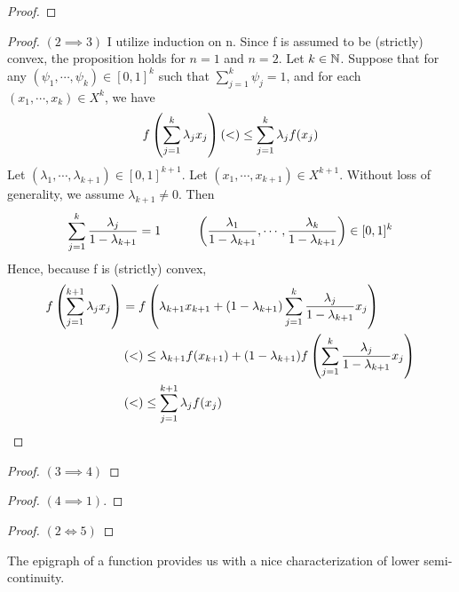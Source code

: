 \begin{prop}
\begin{proof}
    \end{proof}
    \begin{proof}$(2 \implies 3)$
        I utilize induction on n. 
        Since f is assumed to be (strictly) convex, the proposition holds for $n=1$ and $n=2$. 
        Let $k \in \N$.
        Suppose that for any $(\psi_1,\cdots,\psi_k)\in [0,1]^k$ such that $\sum_{j=1}^k \psi_j=1$, and for each $(x_1,\cdots,x_k) \in X^k$, we have
        \begin{equation}
            f\pa{\sum_{j=1}^k \lambda_j x_j} \pa{<}\leq \sum_{j=1}^k \lambda_j f(x_j)
        \end{equation}
        Let $(\lambda_1,\cdots,\lambda_{k+1}) \in [0,1]^{k+1}$. Let $(x_1,\cdots,x_{k+1}) \in X^{k+1}$. Without loss of generality, we assume $\lambda_{k+1} \neq 0$. 
        Then 
        \begin{equation}
            \sum_{j=1}^k \frac{\lambda_j}{1-\lambda_{k+1}}=1 \tab[1cm] \pa{\frac{\lambda_1}{1-\lambda_{k+1}},\cdots,\frac{\lambda_k}{1-\lambda_{k+1}}} \in [0,1]^k
        \end{equation}
        Hence, because f is (strictly) convex, 
        \begin{equation}
            \begin{split}
                f \pa{ \sum_{j=1}^{k+1} \lambda_j x_j} & = f\pa{ \lambda_{k+1}x_{k+1} + (1-\lambda_{k+1}) \sum_{j=1}^k \frac{\lambda_j}{1-\lambda_{k+1}} x_j}\\
                & \pa{<}\leq \lambda_{k+1} f(x_{k+1}) + (1-\lambda_{k+1}) f\pa{\sum_{j=1}^k \frac{\lambda_j}{1-\lambda_{k+1}} x_j} \\
                & \pa{<}\leq \sum_{j=1}^{k+1} \lambda_j f(x_j)
            \end{split}
        \end{equation}
    \end{proof}
    \begin{proof}$(3 \implies 4)$
    \end{proof} 
    \begin{proof} $(4 \implies 1)$. 
    \end{proof} 
    \begin{proof} $(2 \iff 5)$
    \end{proof} 
\end{prop} 
The epigraph of a function provides us with a nice characterization of lower semi-continuity. 
